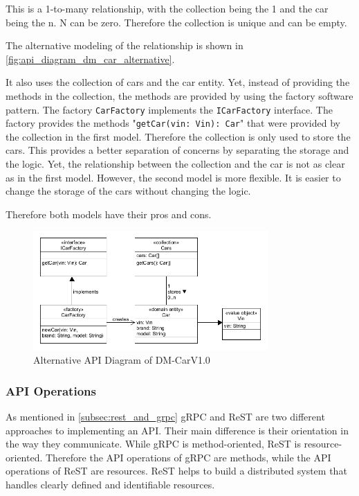 This is a 1-to-many relationship, with the collection being the 1 and the car being the n.
N can be zero.
Therefore the collection is unique and can be empty.

The alternative modeling of the relationship is shown in \autoref{fig:api_diagram_dm_car_alternative}.

It also uses the collection of cars and the car entity.
Yet, instead of providing the methods in the collection, the methods are provided by using the factory software pattern.
The factory \texttt{CarFactory} implements the \texttt{ICarFactory} interface.
The factory provides the methods "\texttt{getCar(vin: Vin): Car}" that were provided by the collection in the first model.
Therefore the collection is only used to store the cars.
This provides a better separation of concerns by separating the storage and the logic.
Yet, the relationship between the collection and the car is not as clear as in the first model.
However, the second model is more flexible.
It is easier to change the storage of the cars without changing the logic.

Therefore both models have their pros and cons.

\begin{figure}[H]
    \centering
    \includegraphics[width=0.8\textwidth]{figures/microservices/dmCar/apiDiagramDM-CarExtended.png}
    \caption{Alternative API Diagram of DM-CarV1.0}
    \label{fig:api_diagram_dm_car_alternative}
\end{figure}

\subsubsection*{API Operations}
As mentioned in \autoref{subsec:rest_and_grpc} gRPC and ReST are two different approaches to implementing an API.
Their main difference is their orientation in the way they communicate.
While gRPC is method-oriented, ReST is resource-oriented.
Therefore the API operations of gRPC are methods, while the API operations of ReST are resources.
ReST helps to build a distributed system that handles clearly defined and identifiable resources.

